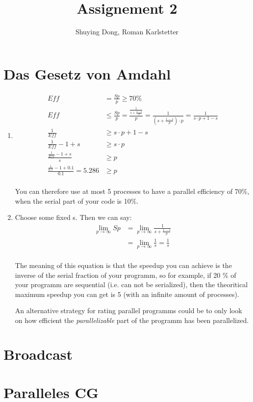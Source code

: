 \documentclass[a4paper,10pt]{article}
\title{Assignement 2}
\author{Shuying Dong, Roman Karlstetter}
\begin{document}
\section{Das Gesetz von Amdahl}
\renewcommand{\labelenumi}{\alph{enumi})}
\begin{enumerate}
 \item 
\begin{align*}
Eff &= \frac{Sp}{p} \geq 70 \% \\
Eff &\leq  \frac{Sp}{p} = \frac{\frac{1}{s+{\frac{1-s}{p}}}}{p} = \frac{1}{(s+{\frac{1-s}{p}}) \cdot p}  = \frac{1}{s\cdot p+1-s}\\
\frac{1}{Eff} &\geq  s\cdot p+1-s\\
\frac{1}{Eff} -1 + s &\geq  s\cdot p\\
\frac{\frac{1}{Eff} -1 + s}{s} &\geq  p\\
\frac{\frac{1}{0.7} -1 + 0.1}{0.1} = 5.286 &\geq  p\\
\end{align*}

You can therefore use at most 5 processes to have a parallel efficiency of 70\%, when the serial part of your code is 10\%.
\item 
Choose some fixed s. Then we can say: 
\begin{align*}
 \lim\limits_{p \rightarrow \infty}{Sp} &= \lim\limits_{p \rightarrow \infty}{\frac{1}{s+{\frac{1-s}{p}}}}\\
&= \lim\limits_{p \rightarrow \infty}{\frac{1}{s}} = \frac{1}{s}\\
\end{align*}

The meaning of this equation is that the speedup you can achieve is the inverse of the serial fraction of your programm, so for example, if 20 \% of your programm are sequential (i.e. can not be serialized), then the theoritical maximum speedup you can get is 5 (with an infinite amount of processes).



An alternative strategy for rating parallel programms could be to only look on how efficient the \textit{parallelizable} part of the programm has been parallelized.

\end{enumerate}

\section{Broadcast}

\section{Paralleles CG}
\end{document}
